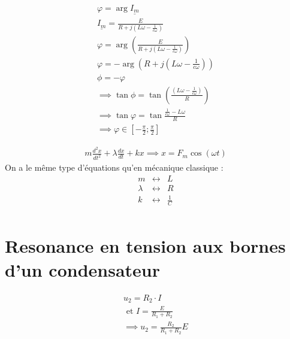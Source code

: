 \begin{eqnarray*}
    \varphi = \arg \underline{I_{m}} \\
    \underline{I_{m}} = \frac{E}{R + j(L \omega -\frac{1}{c \omega })} \\
    \varphi = \arg (\frac{E}{R + j(L \omega -\frac{1}{c \omega })}) \\
    \varphi  = -\arg (R+j(L \omega -\frac{1}{c \omega })) \\
    \phi = - \varphi \\
    \implies \tan \phi  = \tan (\frac{(L \omega - \frac{1}{c \omega })}{R}) \\
    \implies \tan \varphi  = \tan \frac{\frac{1}{c \omega }- L \omega }{R} \\
    \implies \varphi \in [- \frac{\pi }{2} ; \frac{\pi }{2}]
\end{eqnarray*}

\begin{remark}
    \begin{eqnarray*}
        m \frac{d^{2}x}{dt^{2}} + \lambda \frac{dx}{dt} + kx \implies x = F_{m}\cos (\omega t)
    \end{eqnarray*}
    On a le même type d'équations qu'en mécanique classique : 
    \begin{eqnarray*}
        m & \leftrightarrow & L \\
        \lambda & \leftrightarrow & R \\
        k & \leftrightarrow & \frac{1}{C} \\
    \end{eqnarray*}
\end{remark}



\section{Resonance en tension aux bornes d'un condensateur}

\begin{remark}
    \begin{eqnarray*}
        u_{2} = R_{2} \cdot I \\
        \text{ et } I = \frac{E}{R_{1} + R_{2}}\\
        \implies u_{2} = \frac{R_{2}}{R_{1}+R_{2}}E
    \end{eqnarray*}
\end{remark}

